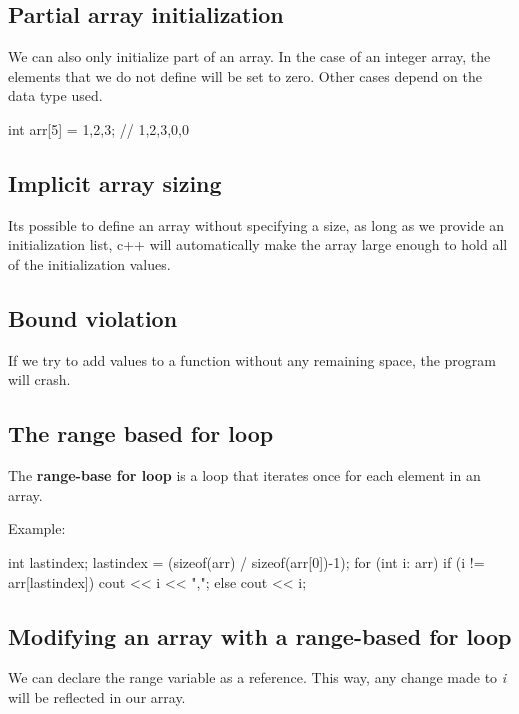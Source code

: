 \documentclass{report}
\begin{document}
    \bigbreak \noindent 
    \bigbreak \noindent 

   \bigbreak \noindent 
   \subsection{Partial array initialization}
   \bigbreak \noindent 
   We can also only initialize part of an array. In the case of an integer array, the elements that we do not define will be set to zero. Other cases depend on the data type used.
   \bigbreak \noindent 
   
   \begin{cppcode}
int arr[5] = {1,2,3}; // {1,2,3,0,0}
   \end{cppcode}
   

   \bigbreak \noindent 
   \subsection{Implicit array sizing}
   \bigbreak \noindent 
   Its possible to define an array without specifying a size, as long as we provide an initialization list, c++ will automatically make the array large enough to hold all of the initialization values.

   \bigbreak \noindent 
   \subsection{Bound violation}
   \bigbreak \noindent 
   If we try to add values to a function without any remaining space, the program will crash.

   \pagebreak
   \subsection{The range based for loop}
   \bigbreak \noindent 
   \begin{concept}
 The \textbf{range-base for loop} is a loop that iterates once for each element in an array.
	\end{concept}
   \bigbreak \noindent 
   Example:
   \bigbreak \noindent 
   
    \begin{cppcode}
int lastindex;
lastindex = (sizeof(arr) / sizeof(arr[0])-1);
for (int i: arr)  {
    if (i != arr[lastindex]) {
        cout << i << ",";
    } else {
        cout << i;
    }
}
   \end{cppcode}
   

   \subsection{Modifying an array with a range-based for loop}
   \bigbreak \noindent 
   We can declare the range variable as a reference. This way, any change made to \textit{i} will be reflected in our array.
   \bigbreak \noindent 
   
\end{document}
